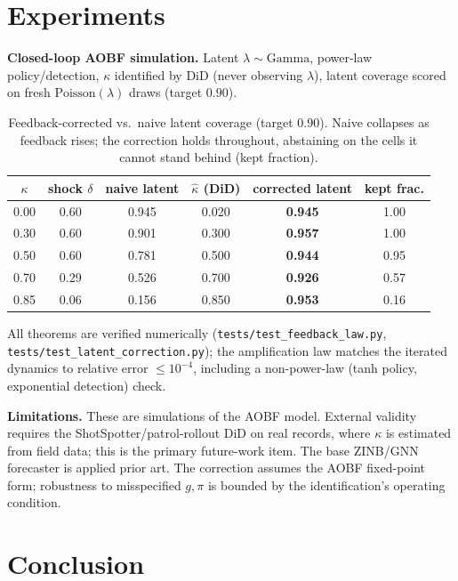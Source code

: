 \documentclass[10pt]{article}
\begin{document}
\section{Experiments}
\label{sec:exp}

\textbf{Closed-loop AOBF simulation.} Latent $\lambda\sim\text{Gamma}$, power-law
policy/detection, $\kappa$ identified by DiD (never observing $\lambda$), latent
coverage scored on fresh $\text{Poisson}(\lambda)$ draws (target $0.90$).

\begin{table}[h]
\centering
\caption{Feedback-corrected vs.\ naive latent coverage (target $0.90$). Naive
collapses as feedback rises; the correction holds throughout, abstaining on the
cells it cannot stand behind (kept fraction).}
\label{tab:correction}
\begin{tabular}{cccccc}
\toprule
$\kappa$ & shock $\delta$ & naive latent & $\hat\kappa$ (DiD) & \textbf{corrected latent} & kept frac. \\
\midrule
0.00 & 0.60 & 0.945 & 0.020 & \textbf{0.945} & 1.00 \\
0.30 & 0.60 & 0.901 & 0.300 & \textbf{0.957} & 1.00 \\
0.50 & 0.60 & 0.781 & 0.500 & \textbf{0.944} & 0.95 \\
0.70 & 0.29 & 0.526 & 0.700 & \textbf{0.926} & 0.57 \\
0.85 & 0.06 & 0.156 & 0.850 & \textbf{0.953} & 0.16 \\
\bottomrule
\end{tabular}
\end{table}

\noindent All theorems are verified numerically (\texttt{tests/test\_feedback\_law.py},
\texttt{tests/test\_latent\_correction.py}); the amplification law matches the
iterated dynamics to relative error $\le 10^{-4}$, including a non-power-law
(tanh policy, exponential detection) check.

\textbf{Limitations.} These are simulations of the AOBF model. External validity
requires the ShotSpotter/patrol-rollout DiD on real records, where $\kappa$ is
estimated from field data; this is the primary future-work item. The base ZINB/GNN
forecaster is applied prior art. The correction assumes the AOBF fixed-point form;
robustness to misspecified $g,\pi$ is bounded by the identification's operating
condition.

\section{Conclusion}
\end{document}
